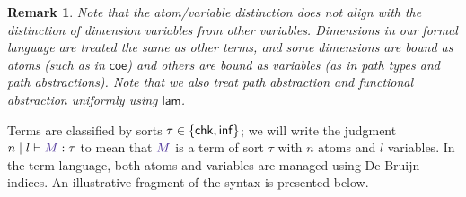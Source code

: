 \documentclass{article}
\DeclarePairedDelimiter\Parens{\lparen}{\rparen}
\DeclarePairedDelimiter\Braces{\lbrace}{\rbrace}
\newtheorem{remark}{Remark}
\newcommand\FmtKwd[1]{\mathsf{#1}}
\newcommand\DeclBox[1]{\framebox{$\displaystyle{}#1$}}
\newcommand\FormatList[3]{%
  \xintFor ##1 in {#3} \do{%
    #1{##1}%
    \xintifForLast{}{#2}
  }
}
\newcommand\Atom[1]{{\boldsymbol\alpha}_{#1}}
\newcommand\Var[1]{\mathsf{v}_{#1}}
\newcommand\SortChk{\FmtKwd{chk}}
\newcommand\SortInf{\FmtKwd{inf}}
\newcommand\FmtTm[1]{{\color{Violet}#1}}
\newcommand\IsTm[4]{{#1}\mid{#2}\vdash\FmtTm{#3}:{#4}}
\newcommand\IsChk[3]{\IsTm{#1}{#2}{#3}{\SortChk}}
\newcommand\IsInf[3]{\IsTm{#1}{#2}{#3}{\SortInf}}
\newcommand\TExp[2]{
  \FmtTm{
    \Parens*{
      \FmtKwd{#1}\
      \FormatList{}{\ }{#2}
    }
  }
}
\begin{document}
\begin{remark}
  Note that the atom/variable distinction does not align with the
  distinction of dimension variables from other variables. Dimensions
  in our formal language are treated the same as other terms, and some
  dimensions are bound as atoms (such as in $\FmtKwd{coe}$) and others
  are bound as variables (as in path types and path
  abstractions). Note that we also treat path abstraction and
  functional abstraction uniformly using $\FmtKwd{lam}$.
\end{remark}


Terms are classified by sorts $\tau\in\Braces*{\SortChk,\SortInf}$; we
will write the judgment $\IsTm{n}{l}{M}{\tau}$ to mean that
$\FmtTm{M}$ is a term of sort $\tau$ with $n$ atoms and $l$
variables. In the term language, both atoms and variables are managed
using De Bruijn indices. An illustrative fragment of the syntax is
presented below.

\end{document}
